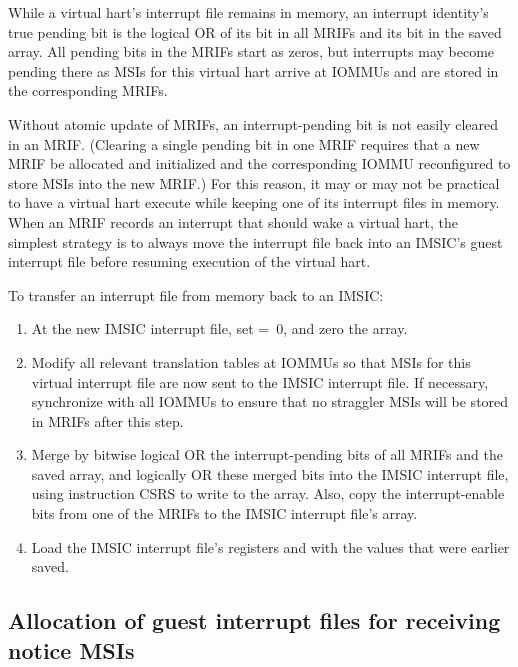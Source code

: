 While a virtual hart's interrupt file remains in memory, an interrupt
identity's true pending bit is the logical OR of its bit in all MRIFs
and its bit in the saved  array.
All pending bits in the MRIFs start as zeros, but interrupts may become
pending there as MSIs for this virtual hart arrive at \mbox{IOMMU}s and are
stored in the corresponding MRIFs.

Without atomic update of MRIFs, an interrupt-pending bit is not easily
cleared in an MRIF.
(Clearing a single pending bit in one MRIF requires that a new MRIF be
allocated and initialized and the corresponding \mbox{IOMMU} reconfigured to
store MSIs into the new MRIF.)
For this reason, it may or may not be practical to have a virtual hart
execute while keeping one of its interrupt files in memory.
When an MRIF records an interrupt that should wake a virtual hart, the
simplest strategy is to always move the interrupt file back into an
IMSIC's guest interrupt file before resuming execution of the virtual
hart.

To transfer an interrupt file from memory back to an IMSIC:
\begin{enumerate}

\item
At the new IMSIC interrupt file, set  =~0, and zero the
 array.

\item
Modify all relevant translation tables at \mbox{IOMMU}s so that MSIs for
this virtual interrupt file are now sent to the IMSIC interrupt file.
If necessary, synchronize with all \mbox{IOMMU}s to ensure that no straggler
MSIs will be stored in MRIFs after this step.

\item
Merge by bitwise logical OR the interrupt-pending bits of all MRIFs and
the saved  array, and logically OR these merged bits into the
IMSIC interrupt file, using instruction CSRS to write to the 
array.
Also, copy the interrupt-enable bits from one of the MRIFs to the IMSIC
interrupt file's  array.

\item
Load the IMSIC interrupt file's registers  and
 with the values that were earlier saved.

\end{enumerate}

\subsection{Allocation of guest interrupt files for receiving notice MSIs}

